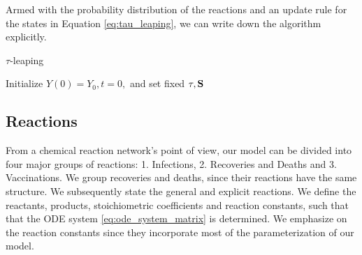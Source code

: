 Armed with the probability distribution of the reactions and an update rule for the states in Equation \eqref{eq:tau_leaping}, we can write down the algorithm explicitly. 

\begin{algorithm}[H]
 \caption{$\tau$-leaping}
 \label{Algo:stochastic}
\SetAlgoLined
{}
 Initialize $Y(0) = Y_0, t=0,$ and set fixed $\tau, \mathbf{S}$\;

\end{algorithm}


\subsection{Reactions}
From a chemical reaction network's point of view, our model can be divided into four major groups of reactions: 1. Infections, 2. Recoveries and Deaths and 3. Vaccinations. We group recoveries and deaths, since their reactions have the same structure. We subsequently state the general and explicit reactions. We define the reactants, products, stoichiometric coefficients and reaction constants, such that that the ODE system \eqref{eq:ode_system_matrix} is determined. We emphasize on the reaction constants since they incorporate most of the parameterization of our model.


